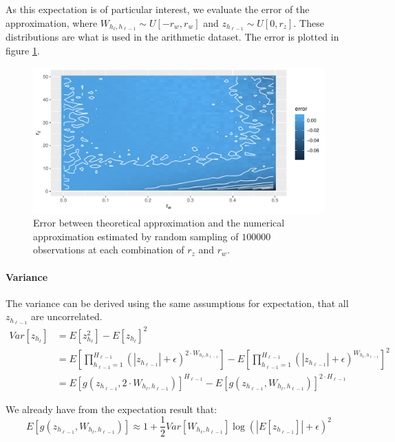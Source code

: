 As this expectation is of particular interest, we evaluate the error of the approximation, where $W_{h_{\ell}, h_{\ell-1}} \sim U[-r_w,r_w]$ and $z_{h_{\ell-1}} \sim U[0, r_z]$. These distributions are what is used in the  arithmetic dataset. The error is plotted in figure \ref{fig:nac-mul-expectation-estimate}.
\begin{figure}[h]
\centering
\includegraphics[width=\linewidth]{graphics/nac-mul-expectation-estimate.pdf}
\caption{Error between theoretical approximation and the numerical approximation estimated by random sampling of $100000$ observations at each combination of $r_z$ and $r_w$.}
\label{fig:nac-mul-expectation-estimate}
\end{figure}

\paragraph{Variance} The variance can be derived using the same assumptions for expectation, that all $z_{h_{\ell-1}}$ are uncorrelated.
\begin{equation}
\begin{aligned}
Var[z_{h_\ell}] &= E[z_{h_\ell}^2] - E[z_{h_\ell}]^2 \\
&= E\left[\prod_{h_{\ell-1}=1}^{H_{\ell-1}} (|z_{h_{\ell-1}}| + \epsilon)^{2 \cdot W_{h_{\ell}, h_{\ell-1}}} \right]
- E\left[\prod_{h_{\ell-1}=1}^{H_{\ell-1}} (|z_{h_{\ell-1}}| + \epsilon)^{W_{h_{\ell}, h_{\ell-1}}}\right]^2 \\
&= E\left[g(z_{h_{\ell-1}}, 2 \cdot W_{h_{\ell}, h_{\ell-1}}) \right]^{H_{\ell-1}}
- E\left[g(z_{h_{\ell-1}}, W_{h_{\ell}, h_{\ell-1}})\right]^{2\cdot H_{\ell-1}}
\end{aligned}
\end{equation}

We already have from the expectation result that:
\begin{equation}
E\left[g(z_{h_{\ell-1}}, W_{h_{\ell}, h_{\ell-1}})\right] \approx 1 + \frac{1}{2} Var[W_{h_{\ell}, h_{\ell-1}}] \log(|E[z_{h_{\ell-1}}]| + \epsilon)^2
\end{equation}

